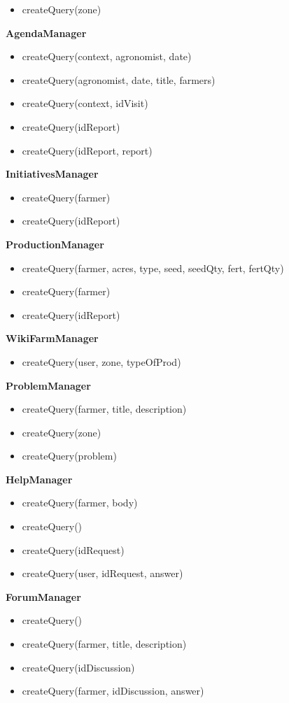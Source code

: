 \begin{itemize}
    \item createQuery(zone)
\end{itemize}
\textbf{AgendaManager}
\begin{itemize}
    \item createQuery(context, agronomist, date)
    \item createQuery(agronomist, date, title, farmers)
    \item createQuery(context, idVisit)
    \item createQuery(idReport)
    \item createQuery(idReport, report)
\end{itemize}
\textbf{InitiativesManager}
\begin{itemize}
    \item createQuery(farmer)
    \item createQuery(idReport)
\end{itemize}
\textbf{ProductionManager}
\begin{itemize}
    \item createQuery(farmer, acres, type, seed, seedQty, fert, fertQty)
    \item createQuery(farmer)
    \item createQuery(idReport)
\end{itemize}
\textbf{WikiFarmManager}
\begin{itemize}
    \item createQuery(user, zone, typeOfProd)
\end{itemize}
\textbf{ProblemManager}
\begin{itemize}
    \item createQuery(farmer, title, description)
    \item createQuery(zone)
    \item createQuery(problem)
\end{itemize}
\textbf{HelpManager}
\begin{itemize}
    \item createQuery(farmer, body)
    \item createQuery()
    \item createQuery(idRequest)
    \item createQuery(user, idRequest, answer)
\end{itemize}
\textbf{ForumManager}
\begin{itemize}
    \item createQuery()
    \item createQuery(farmer, title, description)
    \item createQuery(idDiscussion)
    \item createQuery(farmer, idDiscussion, answer)
\end{itemize}
